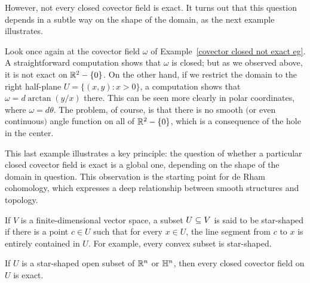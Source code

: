 However, not every closed covector field is exact. It turns out that this question depends in a subtle way on the shape of the domain, as the next example illustrates.
\begin{example}
Look once again at the covector field $\omega$ of Example~\ref{covector closed not exact eg}. A straightforward computation shows that $\omega$ is closed; but as we observed above, it is not exact on $\mathbb{R}^2-\{0\}$. On the other hand, if we restrict the domain to the right half-plane $U=\{(x,y):x>0\}$, a computation shows that $\omega=d\arctan(y/x)$ there. This can be seen more clearly in polar coordinates, where $\omega=d\theta$. The problem, of course, is that there is no smooth $($or even continuous$)$ angle function on all of $\mathbb{R}^2-\{0\}$, which is a consequence of the hole in the center.
\end{example}
This last example illustrates a key principle: the question of whether a particular closed covector field is exact is a global one, depending on the shape of the domain in question. This observation is the starting point for de Rham cohomology, which expresses a deep relationship between smooth structures and topology.\par
If $V$ is a finite-dimensional vector space, a subset $U\subseteq V$ is said to be star-shaped if there is a point $c\in U$ such that for every $x\in U$, the line segment from $c$ to $x$ is entirely contained in $U$. For example, every convex subset is star-shaped.
\begin{theorem}\label{Poincare lemma}
If $U$ is a star-shaped open subset of $\mathbb{R}^n$ or $\mathbb{H}^n$, then every closed covector field on $U$ is exact.
\end{theorem}
